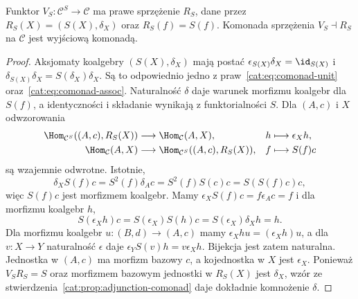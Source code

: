 \begin{twierdzenie}\label{cat:thm:cofree-coalgebra}
Funktor $V_S:\mathcal C^S\to\mathcal C$ ma prawe sprzężenie $R_S$, dane przez $R_S(X)=(S(X),\delta_X)$ oraz $R_S(f)=S(f)$. Komonada sprzężenia $V_S\dashv R_S$ na $\mathcal C$ jest wyjściową komonadą.
\end{twierdzenie}
\begin{proof}
Aksjomaty koalgebry $(S(X),\delta_X)$ mają postać $\epsilon_{S(X)}\delta_X=\id_{S(X)}$ i $\delta_{S(X)}\delta_X=S(\delta_X)\delta_X$. Są to odpowiednio jedno z praw~\eqref{cat:eq:comonad-unit} oraz~\eqref{cat:eq:comonad-assoc}. Naturalność $\delta$ daje warunek morfizmu koalgebr dla $S(f)$, a identyczności i składanie wynikają z funktorialności $S$. Dla $(A,c)$ i $X$ odwzorowania
\begin{align*}
 \Hom_{\mathcal C^S}((A,c),R_S(X))
 &\longrightarrow\Hom_{\mathcal C}(A,X),& h&\longmapsto\epsilon_Xh,\\
 \Hom_{\mathcal C}(A,X)
 &\longrightarrow\Hom_{\mathcal C^S}((A,c),R_S(X)),& f&\longmapsto S(f)c
\end{align*}
są wzajemnie odwrotne. Istotnie,
\[
 \delta_X S(f)c=S^2(f)\delta_Ac=S^2(f)S(c)c=S(S(f)c)c,
\]
więc $S(f)c$ jest morfizmem koalgebr. Mamy $\epsilon_X S(f)c=f\epsilon_Ac=f$ i dla morfizmu koalgebr $h$,
\[
 S(\epsilon_X h)c=S(\epsilon_X)S(h)c=S(\epsilon_X)\delta_Xh=h.
\]
Dla morfizmu koalgebr $u:(B,d)\to(A,c)$ mamy $\epsilon_Xhu=(\epsilon_Xh)u$, a dla $v:X\to Y$ naturalność $\epsilon$ daje $\epsilon_Y S(v)h=v\epsilon_Xh$. Bijekcja jest zatem naturalna. Jednostka w $(A,c)$ ma morfizm bazowy $c$, a kojednostka w $X$ jest $\epsilon_X$. Ponieważ $V_SR_S=S$ oraz morfizmem bazowym jednostki w $R_S(X)$ jest $\delta_X$, wzór ze stwierdzenia~\ref{cat:prop:adjunction-comonad} daje dokładnie komnożenie $\delta$.
\end{proof}

